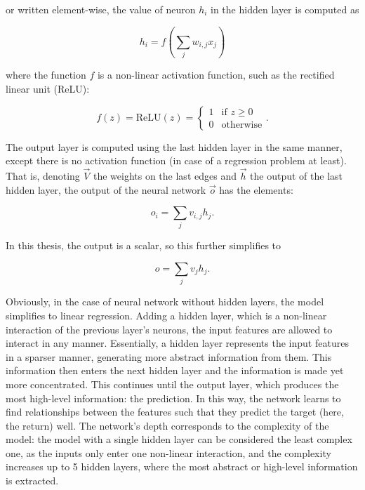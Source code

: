 	or written element-wise, the value of neuron $h_i$ in the hidden layer is computed as 
	
	\begin{equation}
		h_i = f \left( \sum_{j}w_{i,j}x_j \right)
	\end{equation}
	
	where the function $f$ is a non-linear activation function, such as the rectified linear unit (ReLU):
	
	\[
		f(z) = \text{ReLU}(z) =   
			\begin{cases}
				1 & \text{if } z \geq 0\\
				0 & \text{otherwise}
			\end{cases}.
	\]
	
	The output layer is computed using the last hidden layer in the same manner, except there is no activation function (in case of a regression problem at least). That is, denoting $\vec{V}$ the weights on the last edges and $\vec{h}$ the output of the last hidden layer, the output of the neural network $\vec{o}$ has the elements: 
	
	\begin{equation}
		o_i = \sum_{j}v_{i,j} h_j.
	\end{equation}
	
	In this thesis, the output is a scalar, so this further simplifies to 
	
	\begin{equation}
		o = \sum_{j}v_{j} h_j.
	\end{equation}
	
	Obviously, in the case of neural network without hidden layers, the model simplifies to linear regression. Adding a hidden layer, which is a non-linear interaction of the previous layer's neurons, the input features are allowed to interact in any manner. Essentially, a hidden layer represents the input features in a sparser manner, generating more abstract information from them. This information then enters the next hidden layer and the information is made yet more concentrated. This continues until the output layer, which produces the most high-level information: the prediction. In this way, the network learns to find relationships between the features such that they predict the target (here, the return) well. The network's depth corresponds to the complexity of the model: the model with a single hidden layer can be considered the least complex one, as the inputs only enter one non-linear interaction, and the complexity increases up to 5 hidden layers, where the most abstract or high-level information is extracted. 
	
